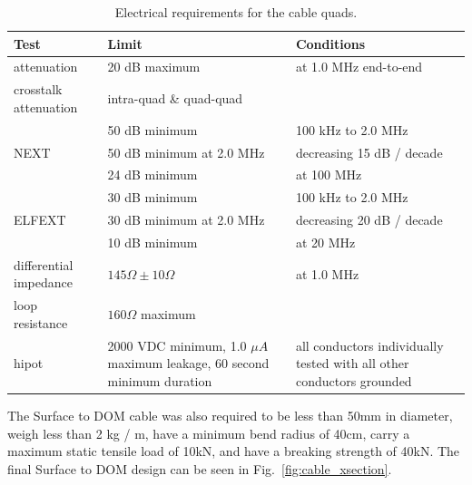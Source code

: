 \begin{table}[h]
  \centering
  \begin{tabularx}{\textwidth}{| l | X | X | }
    \hline
    \bf{Test} & \bf{Limit} & \bf{Conditions} \\
    \hline

    attenuation & 20 dB maximum & at 1.0 MHz end-to-end \\
    \hline

    crosstalk attenuation & intra-quad \& quad-quad & \\
    \hline

    & 50 dB minimum & 100 kHz to 2.0 MHz \\
    \cline {2-3}
    NEXT & 50 dB minimum at 2.0 MHz & decreasing 15 dB / decade \\
    \cline {2-3}
    & 24 dB minimum & at 100 MHz \\
    \hline

    & 30 dB minimum & 100 kHz to 2.0 MHz \\
    \cline {2-3}
    ELFEXT & 30 dB minimum at 2.0 MHz & decreasing 20 dB / decade \\
    \cline {2-3}
    & 10 dB minimum & at 20 MHz \\
    \hline

    differential impedance & $145\Omega \pm 10\Omega$ & at 1.0 MHz \\
    \hline

    loop resistance & $160\Omega$ maximum & \\
    \hline

    hipot & 2000 VDC minimum, 1.0 $\mu A$ maximum leakage, 60 second
    minimum duration & all conductors individually tested with all other
    conductors grounded \\
    \hline    
  \end{tabularx}
  \caption{Electrical requirements for the cable quads.} 
  \label{tab:quad_requirements}
\end{table}

 The Surface to DOM cable was also required to be less than 50mm in
 diameter, weigh less than 2 kg / m, have a minimum bend radius of 40cm,
 carry a maximum static tensile load of 10kN, and have a breaking strength
 of 40kN. The final Surface to DOM design can be seen in
 Fig.~\ref{fig:cable_xsection}.  

